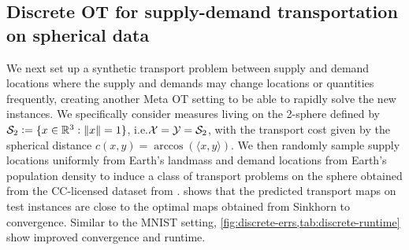\documentclass{article}
\newcommand{\ie}{i.e.\xspace}
\newcommand{\defeq}{\vcentcolon=}
\begin{document}
\newpage
\subsection{Discrete OT for supply-demand transportation on spherical data}
\label{sec:exp:world}

We next set up a synthetic transport problem between supply and demand
locations where the supply and demands may change locations or quantities
frequently, creating another Meta OT setting to be able to rapidly solve
the new instances.
We specifically consider measures living on the 2-sphere defined by
$\gS_2\defeq\{x\in\R^3: \|x\|=1\}$, \ie ${\mathcal{X}}={\mathcal{Y}}={\mathcal{S}}_2$,
with the transport cost given by the spherical distance
$c(x,y)=\arccos(\langle x, y \rangle)$.
We then randomly sample supply locations uniformly from Earth's
landmass and demand locations from Earth's population density to
induce a class of transport problems on the sphere
obtained from the CC-licensed dataset from \citet{doxsey2015taking}.
 shows that the predicted transport maps
on test instances are close to the optimal maps obtained from
Sinkhorn to convergence.
Similar to the MNIST setting, \cref{fig:discrete-errs,tab:discrete-runtime}
show improved convergence and runtime.
\end{document}
